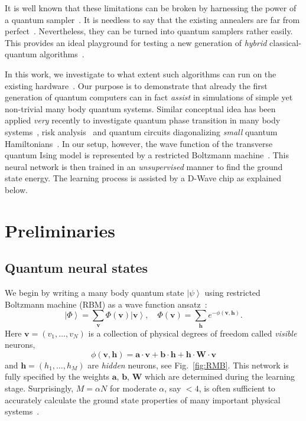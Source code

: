 \documentclass[aps,pra,showpacs,amsmath,amssymb,amsfonts,superscriptaddress,lengthcheck,longbibliography, twocolumn]{revtex4-1}
\newcommand{\ket}[1]{\left|#1\right\rangle}
\newcommand{\bfm}{\boldsymbol}
\begin{document}
It is well known that these limitations can be broken by harnessing the power of a quantum sampler~\cite{Sinitsyn18,Denchev16}. It is needless to say that the existing annealers are far from perfect~\cite{Smolin14,Albash2015,konz_uncertain_2018}. Nevertheless, they can be turned into quantum samplers rather easily. This provides an ideal playground for testing a new generation of \emph{hybrid} classical-quantum algorithms~\cite{Wittek17}.  

In this work, we investigate to what extent such algorithms can run on the existing hardware~\cite{Lloyd17}. Our purpose is to demonstrate that already the first generation of quantum computers can in fact \emph{assist} in simulations of simple yet non-trivial many body quantum systems. Similar conceptual idea has been applied \emph{very} recently to investigate quantum phase transition in many body systems~\cite{king_observation_2018,harris_phase_2018}, risk analysis~\cite{woerner_risk_2018} and quantum circuits diagonalizing 
{\it small} quantum Hamiltonians~\cite{kandala_hardware-efficient_2017,lierta_IBM_2018}.
%
In our setup, however, the wave function of the transverse quantum Ising model is represented by a restricted Boltzmann machine~\cite{Carleo17}. This neural network is then trained in an \emph{unsupervised} manner to find the ground state energy. The learning process is assisted by a D-Wave chip as explained below.
%
\section{Preliminaries}
%
\subsection{Quantum neural states}
%
We begin by writing a many body quantum state $\ket{\psi}$ using restricted Boltzmann
machine (RBM) as a wave function ansatz~\cite{Carleo17,Chen18}:
%
\begin{equation}
\label{eq:rbm}
\ket{\Phi} = \sum_{\bfm v} \Phi(\bfm v)\ket{\bfm v}, \quad
\Phi(\bfm v) = \sum_{\bfm h } e^{-\phi(\bfm v,\bfm h) }.
%
\end{equation}
%
Here $\bfm v = \left(v_1,\dots, v_N\right)$ is a collection of physical degrees of freedom called \emph{visible} neurons, 
%
\begin{equation}
\label{eq:rmbe}
\phi(\bfm v,\bfm h) = \bfm a \cdot \bfm v 
                                + \bfm b \cdot \bfm h 
                                + \bfm h \cdot \bfm W \cdot \bfm v
\end{equation}
%
and $\bfm h = \left(h_1,\dots, h_M\right)$ are \emph{hidden} neurons, see Fig.~\ref{fig:RMB}. This network is fully 
specified by the weights $\bfm a$, $\bfm b$, $\bfm W$ which are determined during the learning stage. Surprisingly, 
$M = \alpha N$ for moderate $\alpha$, say $<4$, is often sufficient to accurately calculate the ground state properties
of many important physical systems~\cite{Carleo17}. 
 
\end{document}
